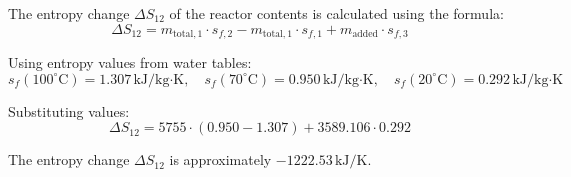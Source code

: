 The entropy change \( \Delta S_{12} \) of the reactor contents is calculated using the formula:  
\[
\Delta S_{12} = m_{\text{total},1} \cdot s_{f,2} - m_{\text{total},1} \cdot s_{f,1} + m_{\text{added}} \cdot s_{f,3}
\]  

Using entropy values from water tables:  
\[
s_f(100^\circ\text{C}) = 1.307 \, \text{kJ/kg·K}, \quad s_f(70^\circ\text{C}) = 0.950 \, \text{kJ/kg·K}, \quad s_f(20^\circ\text{C}) = 0.292 \, \text{kJ/kg·K}
\]  

Substituting values:  
\[
\Delta S_{12} = 5755 \cdot (0.950 - 1.307) + 3589.106 \cdot 0.292
\]  

The entropy change \( \Delta S_{12} \) is approximately \( -1222.53 \, \text{kJ/K} \).